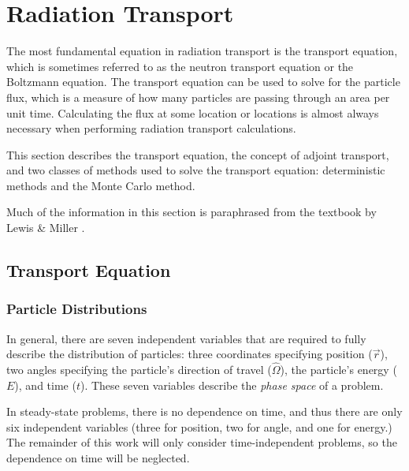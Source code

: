 \section{Radiation Transport}
\label{sec:bg:rt}

The most fundamental equation in radiation transport is the transport equation, which is sometimes referred to as the neutron transport equation or the Boltzmann equation.
The transport equation can be used to solve for the particle flux, which is a measure of how many particles are passing through an area per unit time.
Calculating the flux at some location or locations is almost always necessary when performing radiation transport calculations.

This section describes the transport equation, the concept of adjoint transport, and two classes of methods used to solve the transport equation: deterministic methods and the Monte Carlo method.

Much of the information in this section is paraphrased from the textbook by Lewis \& Miller \cite{lewis_miller}.

\subsection{Transport Equation}
\label{sec:bg:rt:te}

\subsubsection{Particle Distributions}
\label{sec:bg:rt:te:pd}

In general, there are seven independent variables that are required to fully describe the distribution of particles: three coordinates specifying position ($\vec{r}$), two angles specifying the particle's direction of travel ($\hat{\Omega}$), the particle's energy ($E$), and time ($t$).
These seven variables describe the \textit{phase space} of a problem.

In steady-state problems, there is no dependence on time, and thus there are only six independent variables (three for position, two for angle, and one for energy.) The remainder of this work will only consider time-independent problems, so the dependence on time will be neglected.

